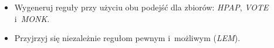 \begin{itemize}
\item Wygeneruj reguły przy użyciu obu podejść dla zbiorów: \emph{HPAP}, \emph{VOTE} i~\emph{MONK}.
\item Przyjrzyj się niezależnie regułom pewnym i~możliwym (\emph{LEM}).
\end{itemize}

